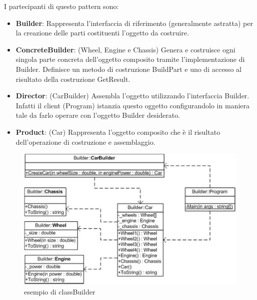 \documentclass[a4paper,10pt]{article}
\begin{document}
                I partecipanti di questo pattern sono:
                        
                \begin{itemize}
                    \item \textbf{Builder}: Rappresenta l’interfaccia di riferimento (generalmente astratta) per la creazione delle parti costituenti l’oggetto da costruire.
                    \item \textbf{ConcreteBuilder}: (Wheel, Engine e Chassis) Genera e costruisce ogni singola parte concreta dell’oggetto composito tramite l’implementazione di Builder. Definisce un metodo di costruzione BuildPart e uno di accesso al risultato della costruzione GetResult.
                    \item \textbf{Director}: (CarBuilder) Assembla l’oggetto utilizzando l’interfaccia Builder. Infatti il client (Program) istanzia questo oggetto configurandolo in maniera tale da farlo operare con l’oggetto Builder desiderato.
                    \item \textbf{Product}: (Car) Rappresenta l’oggetto composito che è il risultato dell’operazione di costruzione e assemblaggio.
                    
                \end{itemize}
                
                \begin{figure}[h!] %
                    \centering
                    \includegraphics[scale=0.5]{img/IC103594}	
                    \caption{esempio di classBuilder}
                \end{figure}
        
                \newpage
\end{document}
